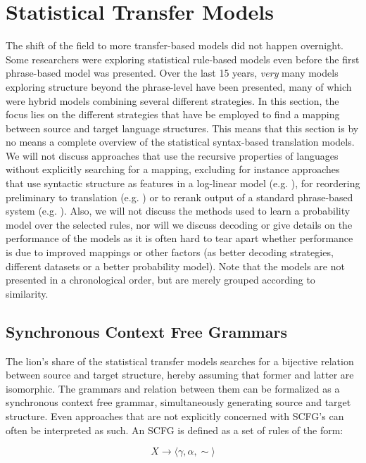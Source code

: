 \documentclass{report}
\theoremstyle{definition}
\theoremstyle{plain}
\begin{document}
\section{Statistical Transfer Models}
\label{sec:transfer_models}

The shift of the field to more transfer-based models did not happen overnight. Some researchers were exploring statistical rule-based models even before the first phrase-based model was presented. Over the last 15 years, \textit{very} many models exploring structure beyond the phrase-level have been presented, many of which were hybrid models combining several different strategies. In this section, the focus lies on the different strategies that have be employed to find a mapping between source and target language structures. This means that this section is by no means a complete overview of the statistical syntax-based translation models. We will not discuss approaches that use the recursive properties of languages without explicitly searching for a mapping, excluding for instance approaches that use syntactic structure as features in a log-linear model (e.g. \cite{cherry2013improved,liu2010semantic}), for reordering preliminary to translation (e.g. \cite{khalilov2012statistical}) or to rerank output of a standard phrase-based system (e.g. \cite{och2004smorgasbord}). Also, we will not discuss the methods used to learn a probability model over the selected rules, nor will we discuss decoding or give details on the performance of the models as it is often hard to tear apart whether performance is due to improved mappings or other factors (as better decoding strategies, different datasets or a better probability model). Note that the models are not presented in a chronological order, but are merely grouped according to similarity.

\subsection{Synchronous Context Free Grammars}
The lion's share of the statistical transfer models searches for a bijective relation between source and target structure, hereby assuming that former and latter are isomorphic. The grammars and relation between them can be formalized as a synchronous context free grammar, simultaneously generating source and target structure. Even approaches that are not explicitly concerned with SCFG's can often be interpreted as such. An SCFG is defined as a set of rules of the form:

\[
X \to \langle \gamma , \alpha , \sim \rangle
\]
\end{document}
